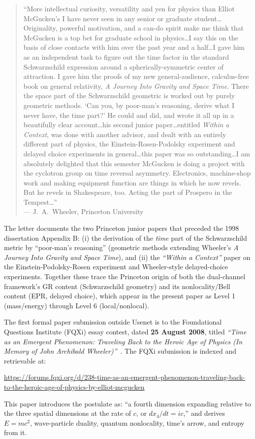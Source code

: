 \documentclass[11pt,a4paper]{article}
\begin{document}
\begin{quote}
``More intellectual curiosity, versatility and yen for physics than Elliot McGucken's I have never seen in any senior or graduate student\ldots Originality, powerful motivation, and a can-do spirit make me think that McGucken is a top bet for graduate school in physics\ldots I say this on the basis of close contacts with him over the past year and a half\ldots I gave him as an independent task to figure out the time factor in the standard Schwarzschild expression around a spherically-symmetric center of attraction. I gave him the proofs of my new general-audience, calculus-free book on general relativity, \emph{A Journey Into Gravity and Space Time}. There the space part of the Schwarzschild geometric is worked out by purely geometric methods. `Can you, by poor-man's reasoning, derive what I never have, the time part?' He could and did, and wrote it all up in a beautifully clear account\ldots his second junior paper\ldots entitled \emph{Within a Context}, was done with another advisor, and dealt with an entirely different part of physics, the Einstein-Rosen-Podolsky experiment and delayed choice experiments in general\ldots this paper was so outstanding\ldots I am absolutely delighted that this semester McGucken is doing a project with the cyclotron group on time reversal asymmetry. Electronics, machine-shop work and making equipment function are things in which he now revels. But he revels in Shakespeare, too. Acting the part of Prospero in the Tempest\ldots'' \\
--- J.\ A.\ Wheeler, Princeton University
\end{quote}

The letter documents the two Princeton junior papers that preceded the 1998 dissertation Appendix B: (i) the derivation of the \emph{time} part of the Schwarzschild metric by ``poor-man's reasoning'' (geometric methods extending Wheeler's \emph{A Journey Into Gravity and Space Time}), and (ii) the \emph{``Within a Context''} paper on the Einstein-Podolsky-Rosen experiment and Wheeler-style delayed-choice experiments. Together these trace the Princeton origin of both the dual-channel framework's GR content (Schwarzschild geometry) and its nonlocality/Bell content (EPR, delayed choice), which appear in the present paper as Level 1 (mass/energy) through Level 6 (local/nonlocal).

The first formal paper submission outside Usenet is to the Foundational Questions Institute (FQXi) essay contest, dated \textbf{25 August 2008}, titled \emph{``Time as an Emergent Phenomenon: Traveling Back to the Heroic Age of Physics (In Memory of John Archibald Wheeler)''}~\cite{mcguckenfqxi2008}. The FQXi submission is indexed and retrievable at:
\begin{center}
\url{https://forums.fqxi.org/d/238-time-as-an-emergent-phenomenon-traveling-back-to-the-heroic-age-of-physics-by-elliot-mcgucken}
\end{center}
This paper introduces the postulate as: ``a fourth dimension expanding relative to the three spatial dimensions at the rate of $c$, or $dx_4/dt = ic$,'' and derives $E = mc^2$, wave-particle duality, quantum nonlocality, time's arrow, and entropy from it.
\end{document}
